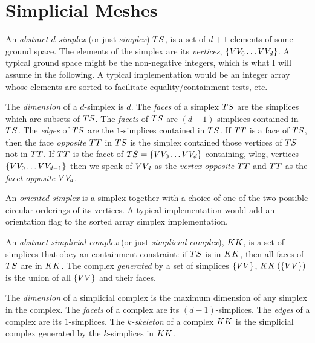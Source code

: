 
\section{Simplicial Meshes}
\label{sec:simplicial-meshes}

An {\it abstract $d$-simplex} (or just {\it simplex})
$T{S}$, is a set of $d+1$ elements of some ground space.
The elements of the simplex are its {\it vertices}, $\{ V{V}_0 \ldots V{V}_d \}$.
A typical ground space might be the non-negative integers,
which is what I will assume in the following.
A typical implementation would be an integer array
whose elements are sorted to facilitate equality/containment tests, etc.

The {\it dimension} of a $d$-simplex is $d$.
The {\it faces} of a simplex $T{S}$ are the simplices which are subsets of $T{S}$.
The {\it facets} of $T{S}$ are $(d-1)$-simplices contained in $T{S}$.
The {\it edges} of $T{S}$ are the $1$-simplices contained in $T{S}$.
If $T{T}$ is a face of $T{S}$,
then the face {\it opposite} $T{T}$ in $T{S}$
is the simplex contained those vertices of $T{S}$
not in $T{T}$.
If $T{T}$ is the facet of $T{S} = \{ V{V}_0 \ldots V{V}_d \}$
containing, wlog, vertices $\{ V{V}_0 \ldots V{V}_{d-1} \}$
then we speak of $V{V}_d$ as the {\it vertex opposite} $T{T}$
and $T{T}$ as the {\it facet opposite} $V{V}_d$.

An {\it oriented simplex} is a simplex together with a choice
of one of the two possible circular orderings of its vertices.
A typical implementation would add an orientation flag
to the sorted array simplex implementation.

An {\it abstract simplicial complex} (or just {\it simplicial complex}),
$K{K}$, is a set of simplices
that obey an containment constraint:
if $T{S}$ is in $K{K}$, then all faces of $T{S}$ are in $K{K}$.
The complex {\it generated} by a set of simplices $\{ V{V} \}$,
$K{K} \left( \{ V{V} \} \right)$ is the union of all $\{ V{V} \}$
and their faces.

The {\it dimension} of a simplicial complex is the maximum dimension
of any simplex in the complex.
The {\it facets} of a complex are its $(d-1)$-simplices.
The {\it edges} of a complex are its $1$-simplices.
The {\it $k$-skeleton} of a complex $K{K}$
is the simplicial complex generated by the $k$-simplices in $K{K}$.


